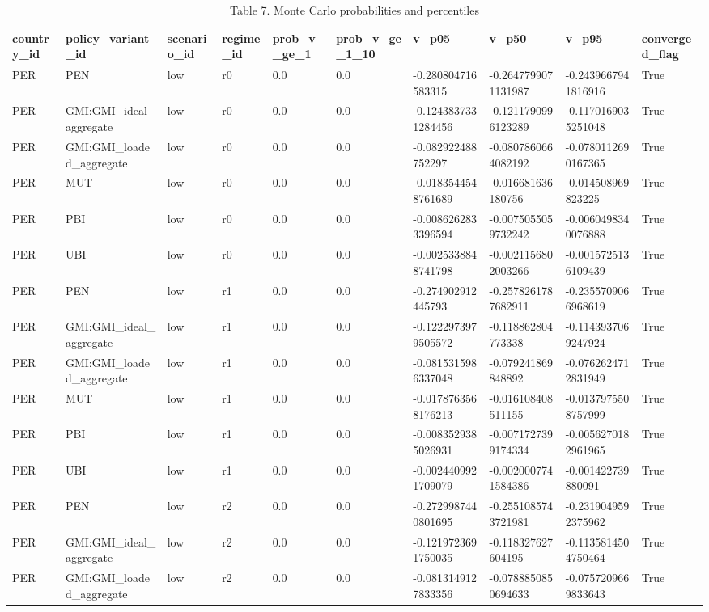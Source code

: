 \begin{table}[!htbp]
\centering
\caption{Table 7. Monte Carlo probabilities and percentiles}
\begin{tabular}{llllllllll}
\toprule
country\_id & policy\_variant\_id & scenario\_id & regime\_id & prob\_v\_ge\_1 & prob\_v\_ge\_1\_10 & v\_p05 & v\_p50 & v\_p95 & converged\_flag \\
\midrule
PER & PEN & low & r0 & 0.0 & 0.0 & -0.280804716583315 & -0.2647799071131987 & -0.2439667941816916 & True \\
PER & GMI:GMI\_ideal\_aggregate & low & r0 & 0.0 & 0.0 & -0.1243837331284456 & -0.1211790996123289 & -0.1170169035251048 & True \\
PER & GMI:GMI\_loaded\_aggregate & low & r0 & 0.0 & 0.0 & -0.082922488752297 & -0.0807860664082192 & -0.0780112690167365 & True \\
PER & MUT & low & r0 & 0.0 & 0.0 & -0.0183544548761689 & -0.016681636180756 & -0.014508969823225 & True \\
PER & PBI & low & r0 & 0.0 & 0.0 & -0.0086262833396594 & -0.0075055059732242 & -0.0060498340076888 & True \\
PER & UBI & low & r0 & 0.0 & 0.0 & -0.0025338848741798 & -0.0021156802003266 & -0.0015725136109439 & True \\
PER & PEN & low & r1 & 0.0 & 0.0 & -0.274902912445793 & -0.2578261787682911 & -0.2355709066968619 & True \\
PER & GMI:GMI\_ideal\_aggregate & low & r1 & 0.0 & 0.0 & -0.1222973979505572 & -0.118862804773338 & -0.1143937069247924 & True \\
PER & GMI:GMI\_loaded\_aggregate & low & r1 & 0.0 & 0.0 & -0.0815315986337048 & -0.079241869848892 & -0.0762624712831949 & True \\
PER & MUT & low & r1 & 0.0 & 0.0 & -0.0178763568176213 & -0.016108408511155 & -0.0137975508757999 & True \\
PER & PBI & low & r1 & 0.0 & 0.0 & -0.0083529385026931 & -0.0071727399174334 & -0.0056270182961965 & True \\
PER & UBI & low & r1 & 0.0 & 0.0 & -0.0024409921709079 & -0.0020007741584386 & -0.001422739880091 & True \\
PER & PEN & low & r2 & 0.0 & 0.0 & -0.2729987440801695 & -0.2551085743721981 & -0.2319049592375962 & True \\
PER & GMI:GMI\_ideal\_aggregate & low & r2 & 0.0 & 0.0 & -0.1219723691750035 & -0.118327627604195 & -0.1135814504750464 & True \\
PER & GMI:GMI\_loaded\_aggregate & low & r2 & 0.0 & 0.0 & -0.0813149127833356 & -0.0788850850694633 & -0.0757209669833643 & True \\

\end{tabular}
\end{table}
